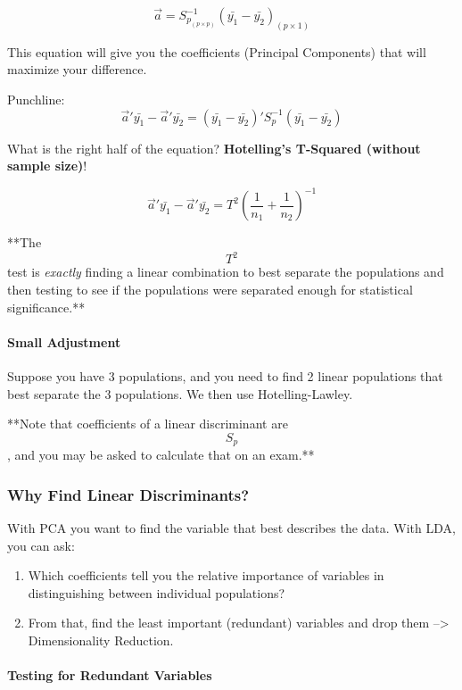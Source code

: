 \[\vec{a} = S_{p_{(p \times p)}}^{-1}(\bar{y_1} - \bar{y_2})_{(p \times 1)}\]

This equation will give you the coefficients (Principal Components) that
will maximize your difference.

Punchline:
\[\vec{a}'\bar{y_1} - \vec{a}'\bar{y_2} = (\bar{y_1} - \bar{y_2})'S_p^{-1}(\bar{y_1} - \bar{y_2})\]

What is the right half of the equation? \textbf{Hotelling's T-Squared
(without sample size)}!

\[\vec{a}'\bar{y_1} - \vec{a}'\bar{y_2} = T^2(\frac{1}{n_1} + \frac{1}{n_2})^{-1}\]

**The \[T^2\] test is \emph{exactly} finding a linear combination to
best separate the populations and then testing to see if the populations
were separated enough for statistical significance.**

\hypertarget{small-adjustment}{%
\paragraph{Small Adjustment}\label{small-adjustment}}

Suppose you have 3 populations, and you need to find 2 linear
populations that best separate the 3 populations. We then use
Hotelling-Lawley.

**Note that coefficients of a linear discriminant are \[S_p\], and you
may be asked to calculate that on an exam.**

\hypertarget{why-find-linear-discriminants}{%
\subsubsection{Why Find Linear
Discriminants?}\label{why-find-linear-discriminants}}

With PCA you want to find the variable that best describes the data.
With LDA, you can ask:

\begin{enumerate}
\def\labelenumi{\arabic{enumi}.}
\tightlist
\item
  Which coefficients tell you the relative importance of variables in
  distinguishing between individual populations?
\item
  From that, find the least important (redundant) variables and drop
  them --\textgreater{} Dimensionality Reduction.
\end{enumerate}

\hypertarget{testing-for-redundant-variables}{%
\paragraph{Testing for Redundant
Variables}\label{testing-for-redundant-variables}}

